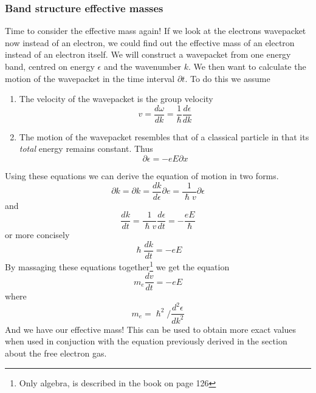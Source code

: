 \documentclass[11pt]{article}
\begin{document}
\subsubsection{Band structure effective masses}
Time to consider the effective mass again! If we look at the electrons wavepacket now instead of an electron, we could find out the effective mass of an electron instead of an electron itself. We will construct a wavepacket from one energy band, centred on energy $\epsilon$ and the wavenumber $k$. We then want to calculate the motion of the wavepacket in the time interval $\partial t$. To  do this we assume
\begin{enumerate}
	\item The velocity of the wavepacket is the group velocity
		\begin{equation}
			v = \frac{d \omega}{dk} = \frac{1}{\hslash} \frac{d \epsilon}{d k}
		\end{equation}
	\item The motion of the wavepacket resembles that of a classical particle in that its \emph{total} energy remains constant. Thus
	\begin{equation}
		\partial \epsilon = - eE \partial x
	\end{equation}
\end{enumerate}
Using these equations we can derive the equation of motion in two forms.
\begin{equation}
	\partial k = \partial k = \frac{dk}{d\epsilon} \partial e = \frac{1}{\hslash v} \partial \epsilon
\end{equation}
and 
\begin{equation}
	\frac{dk}{dt} = \frac{1}{\hslash v} \frac{d \epsilon}{dt} = -\frac{eE}{\hslash}
\end{equation}
or more concisely
\begin{equation}
	\hslash \frac{dk}{dt} = -eE
\end{equation}
By massaging these equations together\footnote{Only algebra, is described in the book on page 126} we get the equation
\begin{equation}
	m_e \frac{dv}{dt} = -eE
\end{equation}
where
\begin{equation}
	m_e = \hslash^2 / \frac{d^2\epsilon}{dk^2}
\end{equation}
And we have our effective mass! This can be used to obtain more exact values when used in conjuction with the equation previously derived in the section about the free electron gas. 
\end{document}
